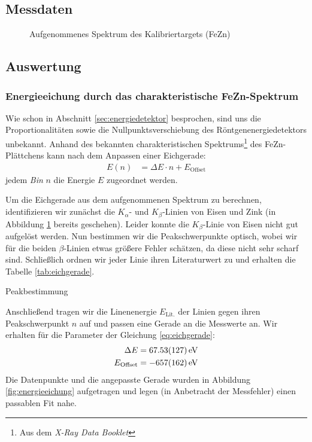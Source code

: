\documentclass[10pt, a4paper]{article}
\begin{document}
\subsection{Messdaten}
\begin{figure}[h]
\centering

\caption{Aufgenommenes Spektrum des Kalibriertargets (FeZn)}
\label{fig:kalibrierung}
\end{figure}

\subsection{Auswertung}
\subsubsection{Energieeichung durch das charakteristische FeZn-Spektrum}
Wie schon in Abschnitt \ref{sec:energiedetektor} besprochen, sind uns die Proportionalitäten sowie die Nullpunktsverschiebung des Röntgenenergiedetektors unbekannt.
Anhand des bekannten charakteristischen Spektrums\footnote{Aus dem \emph{X-Ray Data Booklet}\cite{booklet}} des FeZn-Plättchens kann nach dem Anpassen einer Eichgerade:
\begin{align}
  E(n) &= \Delta E \cdot n + E_\mathrm{Offset}
  \label{eq:eichgerade}
\end{align}
jedem \emph{Bin} $n$ die Energie $E$ zugeordnet werden.

Um die Eichgerade aus dem aufgenommenen Spektrum zu berechnen, identifizieren wir zunächst die $K_\alpha$- und $K_\beta$-Linien von Eisen und Zink (in Abbildung \ref{fig:kalibrierung} bereits geschehen).
Leider konnte die $K_\beta$-Linie von Eisen nicht gut aufgelöst werden.
Nun bestimmen wir die Peakschwerpunkte optisch, wobei wir für die beiden $\beta$-Linien etwas größere Fehler schätzen, da diese nicht sehr scharf sind.
Schließlich ordnen wir jeder Linie ihren Literaturwert zu und erhalten die Tabelle \ref{tab:eichgerade}.
\begin{table}[h]
\centering

\caption{Peakbestimmung}
\label{tab:eichgerade}
\end{table}

Anschließend tragen wir die Linenenergie $E_\mathrm{Lit.}$ der Linien gegen ihren Peakschwerpunkt $n$ auf und passen eine Gerade an die Messwerte an.
Wir erhalten für die Parameter der Gleichung \ref{eq:eichgerade}:
\begin{align}
  \Delta E &= \SI{67,53 +- 1,27}{\electronvolt}\\
  E_\mathrm{Offset} &= \SI{-657 +- 162}{\electronvolt}
\end{align}
Die Datenpunkte und die angepasste Gerade wurden in Abbildung \ref{fig:energieeichung} aufgetragen und legen (in Anbetracht der Messfehler) einen passablen Fit nahe.
\end{document}
